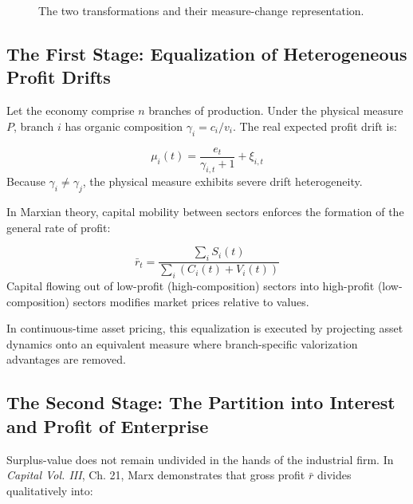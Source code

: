 \documentclass[11pt,letterpaper]{report}
\begin{document}
\begin{figure}[H]\centering
{}
\caption{The two transformations and their measure-change representation.}
\end{figure}
\subsection{The First Stage: Equalization of Heterogeneous Profit Drifts}
Let the economy comprise $n$ branches of production. Under the physical measure $P$, branch $i$ has organic composition ${\gamma }_{i}={c}_{i}/{v}_{i}$. The real expected profit drift is:

\[
{\mu }_{i}(t)=\frac{{e}_{t}}{{\gamma }_{i,t}+1}+{\xi }_{i,t}
\]
Because ${\gamma }_{i}\ne {\gamma }_{j}$, the physical measure exhibits severe drift heterogeneity.

In Marxian theory, capital mobility between sectors enforces the formation of the general rate of profit:

\[
{\bar{r}}_{t}=\frac{\sum_{i}{S}_{i}(t)}{\sum_{i}({C}_{i}(t)+{V}_{i}(t))}
\]
Capital flowing out of low-profit (high-composition) sectors into high-profit (low-composition) sectors modifies market prices relative to values.

In continuous-time asset pricing, this equalization is executed by projecting asset dynamics onto an equivalent measure where branch-specific valorization advantages are removed.

\subsection{The Second Stage: The Partition into Interest and Profit of Enterprise}
Surplus-value does not remain undivided in the hands of the industrial firm. In \emph{Capital Vol. III}, Ch. 21, Marx demonstrates that gross profit $\bar{r}$ divides qualitatively into:
\end{document}
